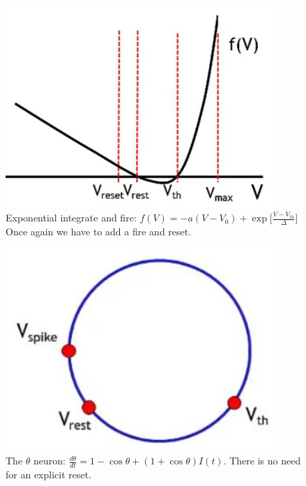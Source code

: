 \documentclass[]{article}
\begin{document}
\begin{figure}[H]
	\caption[Exponential integrate and fire]{Exponential integrate and fire\cite{fourcaud2003spike}: $f(V)=-a(V-V_0) + \exp\big[\frac{V-V_{th}}{\Delta}\big]$ Once again we have to add a fire and reset.}
	\includegraphics[width=0.9\textwidth]{exponential-integrate-and-fire}
\end{figure}

\begin{figure}[H]
	\caption[The $\theta$ neuron]{The $\theta$ neuron\cite{ermentrout1986parabolic}: $\frac{d\theta}{dt}=1-\cos\theta + (1+\cos\theta)I(t)$. There is no need for an explicit reset.}
	\includegraphics[width=0.9\textwidth]{theta-neuron}
\end{figure}
\end{document}
